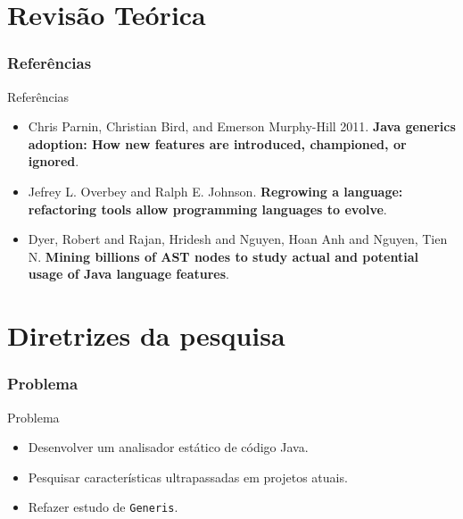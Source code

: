 \documentclass[]{beamer}
\begin{document}
	\section{Revisão Teórica}
	\frametitle{Referências}
	\begin{frame}[label=referencias]
		\begin{block}{Referências}
			\begin{itemize}
				\item Chris Parnin, Christian Bird, and Emerson Murphy-Hill 2011. \textbf{Java generics adoption: How new features are introduced, championed, or ignored}.
				
				\item Jefrey L. Overbey and Ralph E. Johnson. \textbf{Regrowing a language: refactoring tools
				allow programming languages to evolve}.
				
				\item Dyer, Robert and Rajan, Hridesh and Nguyen, Hoan Anh and Nguyen, Tien N. \textbf{Mining billions of AST nodes to study actual and potential usage of Java language features}.
			\end{itemize}
			
		\end{block}
	\end{frame}
	




	\section{Diretrizes da pesquisa}

	\begin{frame}[fragile]\frametitle{Problema}
		\begin{block}{Problema}
			\begin{itemize}
				\item Desenvolver um analisador estático de código Java.
			
				\item Pesquisar características ultrapassadas em projetos atuais.
			
				\item Refazer estudo de \texttt{Generis}.
			\end{itemize}
		\end{block}
	\end{frame}	
	
\end{document}
